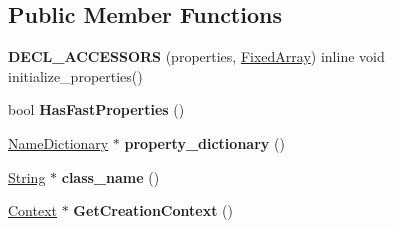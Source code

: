 \subsection*{Public Member Functions}
\begin{DoxyCompactItemize}
\item 
{\bfseries D\+E\+C\+L\+\_\+\+A\+C\+C\+E\+S\+S\+O\+RS} (properties, \hyperlink{classv8_1_1internal_1_1_fixed_array}{Fixed\+Array}) inline void initialize\+\_\+properties()\hypertarget{classv8_1_1internal_1_1_j_s_receiver_ab22ecd20d67890f715d51b4b0604b265}{}\label{classv8_1_1internal_1_1_j_s_receiver_ab22ecd20d67890f715d51b4b0604b265}

\item 
bool {\bfseries Has\+Fast\+Properties} ()\hypertarget{classv8_1_1internal_1_1_j_s_receiver_aa5bf21c10fdbeea5ec73ded8ae926f9b}{}\label{classv8_1_1internal_1_1_j_s_receiver_aa5bf21c10fdbeea5ec73ded8ae926f9b}

\item 
\hyperlink{classv8_1_1internal_1_1_name_dictionary}{Name\+Dictionary} $\ast$ {\bfseries property\+\_\+dictionary} ()\hypertarget{classv8_1_1internal_1_1_j_s_receiver_af3a1fbe0313bc788686f0eeeaecd3049}{}\label{classv8_1_1internal_1_1_j_s_receiver_af3a1fbe0313bc788686f0eeeaecd3049}

\item 
\hyperlink{classv8_1_1internal_1_1_string}{String} $\ast$ {\bfseries class\+\_\+name} ()\hypertarget{classv8_1_1internal_1_1_j_s_receiver_a6a4858fbbc8e6daab429fc59c8b8d9a6}{}\label{classv8_1_1internal_1_1_j_s_receiver_a6a4858fbbc8e6daab429fc59c8b8d9a6}

\item 
\hyperlink{classv8_1_1internal_1_1_context}{Context} $\ast$ {\bfseries Get\+Creation\+Context} ()\hypertarget{classv8_1_1internal_1_1_j_s_receiver_a843d03d6c347d8b9c839218e2ad29088}{}\label{classv8_1_1internal_1_1_j_s_receiver_a843d03d6c347d8b9c839218e2ad29088}

\end{DoxyCompactItemize}
